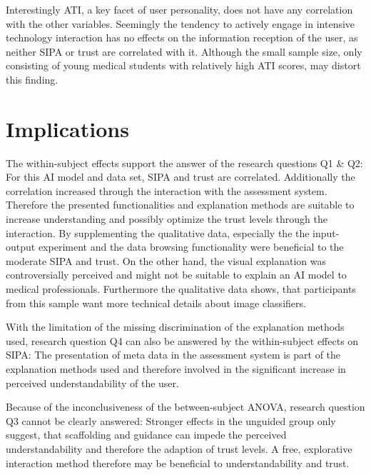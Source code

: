 \documentclass[11pt,a4paper,english]{scrreprt}
\begin{document}
Interestingly ATI, a key facet of user personality, does not have any correlation with the other variables. Seemingly the tendency to actively engage in intensive technology interaction has no effects on the information reception of the user, as neither SIPA or trust are correlated with it. Although the small sample size, only consisting of young medical students with relatively high ATI scores, may distort this finding.

\section{Implications}
The within-subject effects support the answer of the research questions Q1 \& Q2: For this AI model and data set, SIPA and trust are correlated. Additionally the correlation increased through the interaction with the assessment system. Therefore the presented functionalities and explanation methods are suitable to increase understanding and possibly optimize the trust levels through the interaction. By supplementing the qualitative data, especially the the input-output experiment and the data browsing functionality were beneficial to the moderate SIPA and trust. On the other hand, the visual explanation was controversially perceived and might not be suitable to explain an AI model to medical professionals. Furthermore the qualitative data shows, that participants from this sample want more technical details about image classifiers.

With the limitation of the missing discrimination of the explanation methods used, research question Q4 can also be answered by the within-subject effects on SIPA: The presentation of meta data in the assessment system is part of the explanation methods used and therefore involved in the significant increase in perceived understandability of the user.

Because of the inconclusiveness of the between-subject ANOVA, research question Q3 cannot be clearly answered: Stronger effects in the unguided group only suggest, that scaffolding and guidance can impede the perceived understandability and therefore the adaption of trust levels. A free, explorative interaction method therefore may be beneficial to understandability and trust.  
\end{document}
